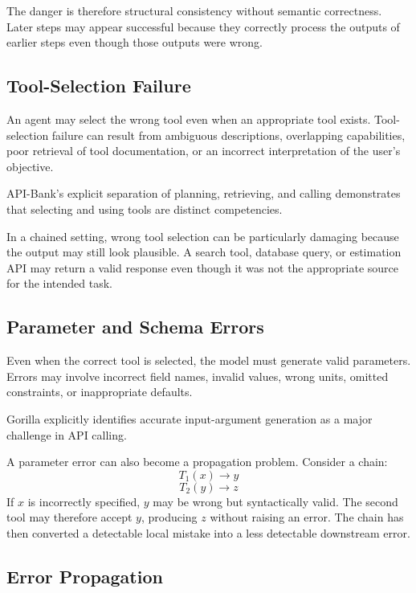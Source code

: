\documentclass[11pt]{article}
\begin{document}
The danger is therefore structural consistency without semantic correctness.
Later steps may appear successful because they correctly process the outputs of
earlier steps even though those outputs were wrong.

\subsection{Tool-Selection Failure}

An agent may select the wrong tool even when an appropriate tool exists.
Tool-selection failure can result from ambiguous descriptions, overlapping
capabilities, poor retrieval of tool documentation, or an incorrect interpretation of
the user's objective.

API-Bank's explicit separation of planning, retrieving, and calling
demonstrates that selecting and using tools are distinct competencies.

In a chained setting, wrong tool selection can be particularly damaging because the
output may still look plausible. A search tool, database query, or estimation API may
return a valid response even though it was not the appropriate source for the
intended task.

\subsection{Parameter and Schema Errors}

Even when the correct tool is selected, the model must generate valid parameters.
Errors may involve incorrect field names, invalid values, wrong units, omitted
constraints, or inappropriate defaults.

Gorilla explicitly identifies accurate input-argument generation as a major challenge in API calling.

A parameter error can also become a propagation problem. Consider a chain:
\begin{equation}
T_1(x) \rightarrow y
\label{eq:t1}
\end{equation}
\begin{equation}
T_2(y) \rightarrow z
\label{eq:t2}
\end{equation}
If $x$ is incorrectly specified, $y$ may be wrong but syntactically valid. The
second tool may therefore accept $y$, producing $z$ without raising an error.
The chain has then converted a detectable local mistake into a less detectable
downstream error.

\subsection{Error Propagation}
\end{document}
